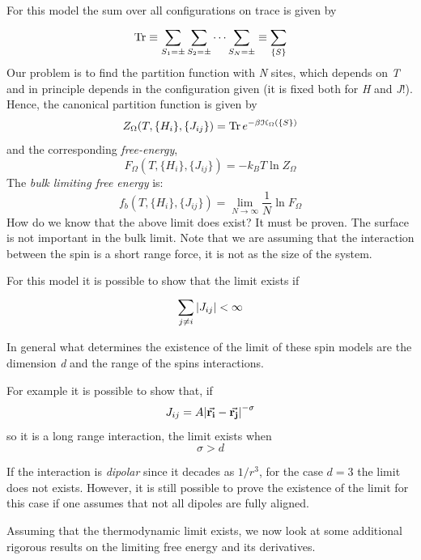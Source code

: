 \documentclass[../main/main.tex]{subfiles}
\begin{document}
For this model the sum over all configurations on trace is given by
\begin{equation}
  \Tr \equiv \sum_{S_1 = \pm }^{}  \sum_{S_2 = \pm }^{}  \dots \sum_{S_N = \pm }^{} \equiv \sum_{\{ S \}  }^{}
\end{equation}
 Our problem is to find the partition function with \emph{N} sites, which depends on \emph{T} and in principle depends in the configuration given (it is fixed both for \emph{H} and \emph{J}!).
Hence, the canonical partition function is given by
\begin{equation}
  Z_{\Omega } (T, \{ H_i \}, \{ J_{ij} \}    ) = \Tr e^{-\beta \mathcal{H}_ \Omega ( \{ S \}  )}
\end{equation}
and the corresponding \emph{free-energy},
\begin{equation}
  F_ \Omega  (T, \{ H_i \}, \{ J_{ij} \} ) = - k_B T \ln{Z_ \Omega }
\end{equation}
The \emph{bulk limiting free energy} is:
\begin{equation}
  f_b (T, \{ H_i \}, \{ J_{ij} \} ) = \lim_{N \rightarrow \infty }\frac{1}{N}  \ln { F_ \Omega  }
\end{equation}
How do we know that the above limit does exist? It must be proven. The surface is not important in the bulk limit.
 Note that we are assuming that the interaction between the spin is a short range force, it is not as the size of the system.

For this model it is possible to show that the limit exists if
\begin{equation}
  \sum_{j \neq i}^{} \abs{J_{ij}} < \infty
\end{equation}
\begin{remark}
In general what determines the existence of the limit of these spin models are the dimension \emph{d} and the range of the spins interactions.
\end{remark}
For example it is possible to show that, if
\begin{equation}
  J_{ij} = A \abs{\va{r_i}-\va{r_j}  }^{-\sigma}
\end{equation}
so it is a long range interaction, the limit exists when
\begin{equation*}
  \sigma > d
\end{equation*}
\begin{remark}
If the interaction is \emph{dipolar} since it decades as \( 1/r^3 \), for the case \( d=3 \) the limit does not exists. However, it is still possible to prove the existence of the limit for this case if one assumes that not all dipoles are fully aligned.
\end{remark}
Assuming that the thermodynamic limit exists, we now look at some additional rigorous results on the limiting free energy and its derivatives.
\end{document}
